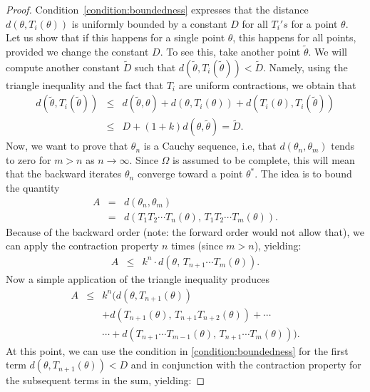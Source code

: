 \documentclass[10pt,a4paper]{amsart}
\begin{document}
\begin{proof}
    Condition~\cref{condition:boundedness} expresses that the distance $d(\theta, T_i(\theta))$ is uniformly bounded by a constant $D$ for all $T_i's$ for a point $\theta$. Let us show that if this happens for a single point $\theta$, this happens for all points, provided we change the constant $D$. To see this, take another point $\tilde \theta$. We will compute another constant $\tilde D$ such that $d(\tilde \theta, T_i(\tilde \theta)) < \tilde D$. Namely, using the triangle inequality and the fact that $T_i$ are uniform contractions, we obtain that
    \begin{eqnarray*}
        d(\tilde \theta,T_i(\tilde \theta)) 
        & \leq & d(\tilde \theta, \theta)+d(\theta,T_i(\theta))+d(T_i( \theta),T_i (\tilde \theta)) \\
        & \leq & D+(1+k)d(\theta, \tilde \theta) = \tilde D.
    \end{eqnarray*}
    Now, we want to prove that $\theta_n$ is a Cauchy sequence, i.e, that $d(\theta_n, \theta_m)$ tends to zero for $m>n$ as $n\rightarrow \infty$. Since $\Omega$ is assumed to be complete, this will mean that the backward iterates $\theta_n$ converge toward a point $\theta^*$.  
    The idea is to bound the quantity
    \begin{eqnarray*}
    A & = &  d(\theta_n, \theta_m) \\
      & = & d(T_{1}T_{2}\cdots T_{n}(\theta),\,T_{1}T_{2}\cdots T_{m}(\theta)).
    \end{eqnarray*}
    Because of the backward order (note: the forward order would not allow that), we can apply the contraction property $n$ times (since $m> n$), yielding:
    \begin{eqnarray*}
        A & \leq & k^{n}\cdot d(\theta,\,T_{n+1}\cdots T_{m}(\theta)).
    \end{eqnarray*}
Now a simple application of the triangle inequality produces
    \begin{eqnarray*}
        A & \leq &  k^{n}\Big(d(\theta,T_{n+1}(\theta)) \\
          &      & + d(T_{n+1}(\theta),\,T_{n+1}T_{n+2}(\theta))+\cdots\\
          &      & \cdots +d(T_{n+1}\cdots T_{m-1}(\theta),\,T_{n+1}\cdots T_{m}(\theta))\Big).
    \end{eqnarray*}
At this point, we can use the condition in \cref{condition:boundedness} for the first term $d(\theta,T_{n+1}(\theta)) < D$ and in conjunction with the contraction property for the subsequent terms in the sum, yielding:

\end{proof}
\end{document}
